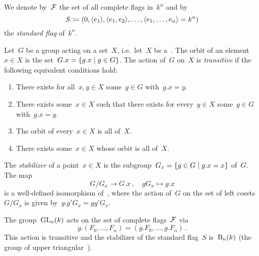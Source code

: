 We denote by~$\mathcal{F}$ the set of all complete flags in~$k^n$ and by
\[
  S
  \coloneqq
  (0, \langle e_1\rangle, \langle e_1, e_2\rangle, \dotsc, \langle e_1, \dotsc, e_n\rangle = k^n)
\]
the \emph{standard flag} of~$k^n$.

\begin{recall}
  \label{recalling group actions}
  Let~$G$ be a group acting on a set~$X$, i.e.\ let~$X$ be a~{}.
  The orbit of an element~$x \in X$ is the set~$G.x = \{g.x \suchthat g \in G\}$.
  The action of~$G$ on~$X$ is \emph{transitive} if the following equivalent conditions hold:
  \begin{enumerate}
    \item
      There exists for all~$x, y \in X$ some~$g \in G$ with~$g.x = y$.
    \item
      There exists some~$x \in X$ such that there exists for every~$y \in X$ some~$g \in G$ with~$g.x = y$.
    \item
      The orbit of every~$x \in X$ is all of~$X$.
    \item
      There exists some~$x \in X$ whose orbit is all of~$X$.
  \end{enumerate}
  The \emph{stabilizer} of a point~$x \in X$ is the subgroup~$G_x = \{g \in G \suchthat g.x = x\}$ of~$G$.
  The map
  \[
    G/G_x
    \to
    G.x \,,
    \quad
    g G_x
    \mapsto
    g.x
  \]
  is a well-defined isomorphism of~{}, where the action of~$G$ on the set of left cosets~$G/G_x$ is given by~$g.g'G_x = g g' G_x$.
\end{recall}

\begin{lemma}
  \label{action on flags}
  The group~$\operatorname{GL}_n(k)$ acts on the set of complete flags~$\mathcal{F}$ via
  \[
    g.(F_0, \dotsc, F_n)
    =
    (g.F_0, \dotsc, g.F_n)  \,.
  \]
  This action is transitive and the stabilizer of the standard flag~$S$ is~$\operatorname{B}_n(k)$ (the group of upper triangular~{}).
\end{lemma}

